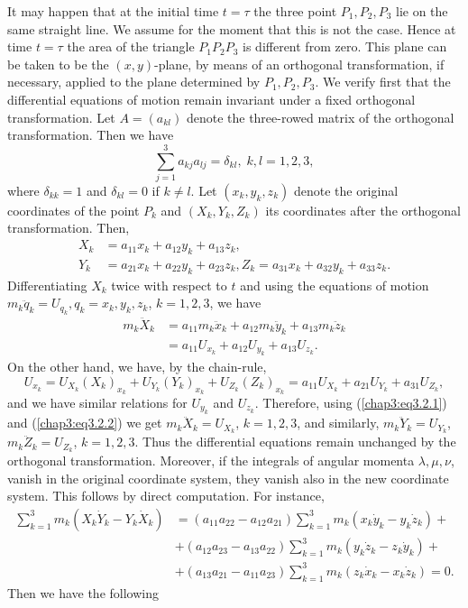 It may happen that at the initial time $t = \tau$ the three point
$P_1, P_2 , P_3$ lie on the same straight line. We assume for the
moment that this is not the case. Hence at time $t = \tau$ the area of
the triangle $P_1 P_2 P_3$ is different from zero. This plane can be
taken to be the $(x,y)$-plane, by means of an orthogonal
transformation, if necessary,  applied to the plane determined by
$P_1, P_2, P_3$. We verify first that the differential equations of
motion remain invariant under a fixed orthogonal transformation. Let
$A = (a_{kl})$ denote the three-rowed matrix of the orthogonal
transformation. Then we have  
\begin{equation*}
\sum\limits^3_{j=1}  a_{kj} a_{lj} = \delta_{kl}, \; k,l = 1,2,3,
\tag{3.2.1}\label{chap3:eq3.2.1} 
\end{equation*}
where $\delta_{kk} = 1$ and $\delta_{kl} = 0$ if $k \neq l$. Let
$(x_k, y_k , z_k)$ denote the original coordinates of the point $P_k$
and $(X_k, Y_k, Z_k)$ its coordinates after the orthogonal
transformation. Then,  
\begin{align*}
X_k &= a_{11} x_k + a_{12} y_k + a_{13} z_k,\\ 
Y_k &= a_{21}x_k + a_{22} y_k + a_{23}z_k, Z_k = a_{31} x_k + a_{32}
y_k + a_{33}z_k.  
\end{align*}
Differentiating $X_k$ twice with respect to $t$ and using the
equations of motion $m_k \ddot{q}_k = U_{q_k}, q_k = x_k, y_k, z_k $,
$k = 1,2,3$, we have  
\begin{align*}
m_k \ddot{X}_k & = a_{11} m_k \ddot{x}_k + a_{12} m_k \ddot{y}_k +
a_{13} m_k \ddot{z}_k \\ 
& = a_{11} U_{x_k} + a_{12} U_{y_k} + a_{13}
U_{z_k}.\tag{3.2.2}\label{chap3:eq3.2.2} 
\end{align*}
On the other hand, we have, by the chain-rule,
$$
U_{x_k} = U_{X_k} (X_{k})_{x_k} + U_{Y_k} (Y_k)_{x_k} + U_{Z_k}
(Z_k)_{x_k} = a_{11} U_{X_k} + a_{21} U_{Y_k} + a_{31} U_{Z_k}, 
$$\pageoriginale
and we have similar relations for $U_{y_k}$ and $U_{z_k}$. Therefore,
using (\ref{chap3:eq3.2.1}) and (\ref{chap3:eq3.2.2}) we get $m_k
\ddot{X}_k = U_{X_k}$, $k = 1,2,3$, and similarly, $m_k \ddot{Y}_k =
U_{Y_k}$, $m_k \ddot{Z}_k = U_{Z_k}$, $k = 1,2,3$. Thus the
differential equations remain unchanged by the orthogonal
transformation. Moreover, if the integrals of angular momenta
$\lambda, \mu, \nu$, vanish in the original coordinate system, they
vanish also in the new coordinate system. This follows by direct
computation. For instance,  
\begin{align*}
\sum\limits^3_{k=1} m_k (X_k \dot{Y}_k - Y_k \dot{X}_k) & = (a_{11}
a_{22} - a_{12} a_{21}) \sum\limits^3_{k=1} m_k (x_k \dot{y}_k - y_k
\dot{z}_k) + \\ 
& + (a_{12} a_{23} - a_{13} a_{22}) \sum\limits^3_{k=1} m_k (y_k
\dot{z}_k - z_k \dot{y}_k) + \\ 
& + (a_{13} a_{21} - a_{11} a_{23}) \sum\limits^3_{k=1} m_k (z_k
\dot{x}_k - x_k \dot{z}_k) = 0. 
\end{align*}
Then we have the following

